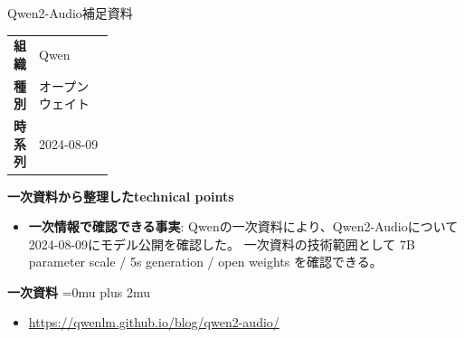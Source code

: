 \begin{technicalnote}{Qwen2-Audio}{補足資料}
\begingroup
\begin{tabularx}{\linewidth}{@{}>{\bfseries}p{0.22\linewidth}X@{}}
組織 & Qwen \\
種別 & オープンウェイト \\
時系列 & 2024-08-09 \\
\end{tabularx}
\smallskip
{\bfseries 一次資料から整理したtechnical points}
\begin{itemize}[leftmargin=1.5em,itemsep=0.35em]
\item \textbf{一次情報で確認できる事実}: Qwenの一次資料により、Qwen2-Audioについて2024-08-09にモデル公開を確認した。 一次資料の技術範囲として 7B parameter scale / 5s generation / open weights を確認できる。
\end{itemize}
\begin{minipage}{\linewidth}
\begin{samepage}
{\bfseries 一次資料}
\begingroup\sloppy
\Urlmuskip=0mu plus 2mu\relax
\begin{itemize}[leftmargin=1.5em,itemsep=0.25em]
\item {\scriptsize\url{https://qwenlm.github.io/blog/qwen2-audio/}}
\end{itemize}
\endgroup
\end{samepage}
\end{minipage}
\endgroup
\end{technicalnote}
\medskip

